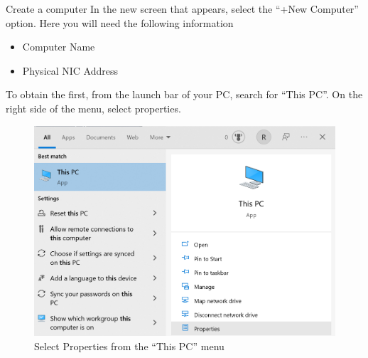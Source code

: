 \documentclass[fleqn]{beamer}
\newcommand{\quotes}[1]{``#1''}
\begin{document}
\begin{frame}{Create a computer}
    In the new screen that appears, select the \quotes{+New Computer} option. Here you will need the following information \begin{itemize}
        \item Computer Name
        \item Physical NIC Address
    \end{itemize}
To obtain the first, from the launch bar of your PC, search for \quotes{This PC}. On the right side of the menu, select properties.
\vspace{-1cm}
\begin{figure}
    \centering
    \includegraphics[scale=.2]{figures/pcproperties.png}
    \caption{Select Properties from the \quotes{This PC} menu}
    \label{fig:my_label}
\end{figure}
\end{frame}
\end{document}
